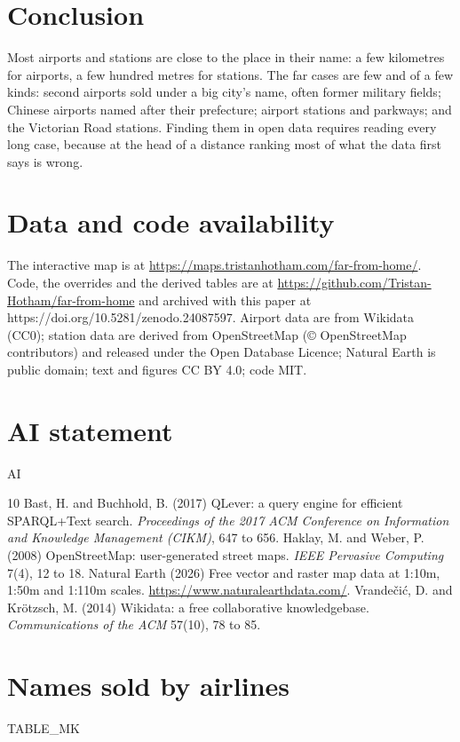 \documentclass[11pt,a4paper]{article}
\begin{document}
\section{Conclusion}
Most airports and stations are close to the place in their name: a few kilometres for airports, a few hundred metres for stations. The far cases are few and of a few kinds: second airports sold under a big city's name, often former military fields; Chinese airports named after their prefecture; airport stations and parkways; and the Victorian Road stations. Finding them in open data requires reading every long case, because at the head of a distance ranking most of what the data first says is wrong.

\section*{Data and code availability}
The interactive map is at \url{https://maps.tristanhotham.com/far-from-home/}. Code, the overrides and the derived tables are at \url{https://github.com/Tristan-Hotham/far-from-home} and archived with this paper at https://doi.org/10.5281/zenodo.24087597. Airport data are from Wikidata (CC0); station data are derived from OpenStreetMap (\copyright{} OpenStreetMap contributors) and released under the Open Database Licence; Natural Earth is public domain; text and figures CC BY 4.0; code MIT.

\section*{AI statement}
{{AI}}

\begin{thebibliography}{10}
 Bast, H. and Buchhold, B. (2017) QLever: a query engine for efficient SPARQL+Text search. \textit{Proceedings of the 2017 ACM Conference on Information and Knowledge Management (CIKM)}, 647 to 656.
 Haklay, M. and Weber, P. (2008) OpenStreetMap: user-generated street maps. \textit{IEEE Pervasive Computing} 7(4), 12 to 18.
 Natural Earth (2026) Free vector and raster map data at 1:10m, 1:50m and 1:110m scales. \url{https://www.naturalearthdata.com/}.
 Vrandečić, D. and Krötzsch, M. (2014) Wikidata: a free collaborative knowledgebase. \textit{Communications of the ACM} 57(10), 78 to 85.
\end{thebibliography}

\appendix
\section{Names sold by airlines}
{{TABLE_MK}}
\end{document}
